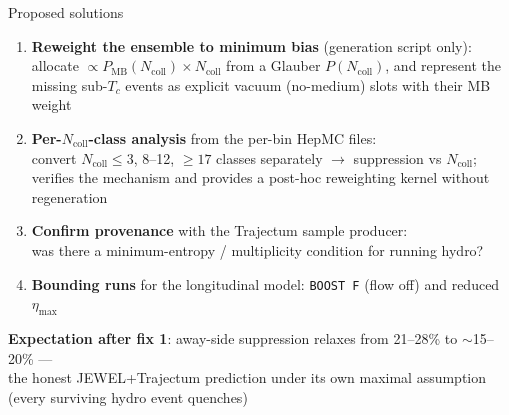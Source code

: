 \documentclass[aspectratio=169]{beamer}
\begin{document}
\begin{frame}[t]{Proposed solutions}
  \begin{enumerate}
    \item \textbf{Reweight the ensemble to minimum bias} (generation script only):\\
          allocate $\propto P_\mathrm{MB}(N_\mathrm{coll}) \times N_\mathrm{coll}$ from a Glauber $P(N_\mathrm{coll})$, and represent the missing sub-$T_c$ events as explicit vacuum (no-medium) slots with their MB weight
    \item \textbf{Per-$N_\mathrm{coll}$-class analysis} from the per-bin HepMC files:\\
          convert $N_\mathrm{coll} \le 3$, 8--12, $\ge 17$ classes separately $\to$ suppression vs $N_\mathrm{coll}$; verifies the mechanism and provides a post-hoc reweighting kernel without regeneration
    \item \textbf{Confirm provenance} with the Trajectum sample producer:\\
          was there a minimum-entropy / multiplicity condition for running hydro?
    \item \textbf{Bounding runs} for the longitudinal model: \texttt{BOOST F} (flow off) and reduced $\eta_\mathrm{max}$
  \end{enumerate}
  \vspace{0.6em}
  \textbf{Expectation after fix 1}: away-side suppression relaxes from 21--28\% to $\sim$15--20\% ---\\
  the honest JEWEL+Trajectum prediction under its own maximal assumption\\
  (every surviving hydro event quenches)
\end{frame}
\end{document}
